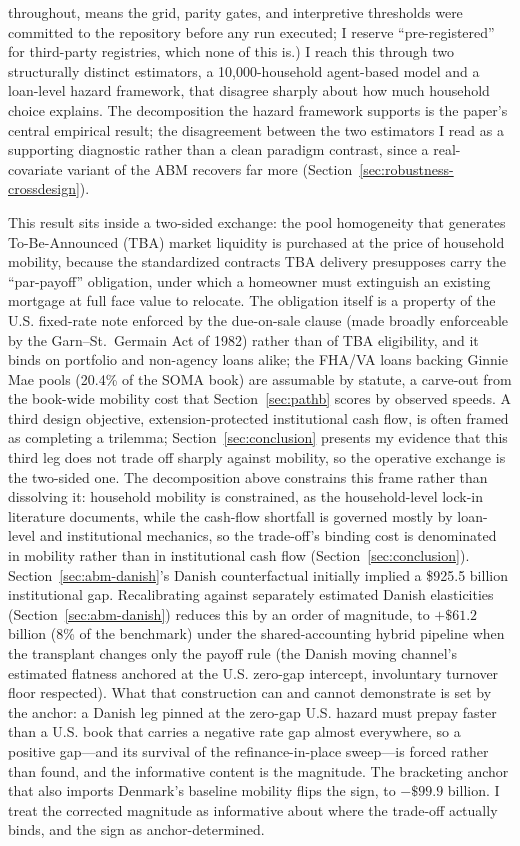 \documentclass[12pt]{article}
\begin{document}
throughout, means the grid, parity gates, and interpretive thresholds were committed to the repository before any run executed; I reserve ``pre-registered'' for third-party registries, which none of this is.) I reach this through two structurally distinct estimators, a 10,000-household agent-based model and a loan-level hazard framework, that disagree sharply about how much household choice explains. The decomposition the hazard framework supports is the paper's central empirical result; the disagreement between the two estimators I read as a supporting diagnostic rather than a clean paradigm contrast, since a real-covariate variant of the ABM recovers far more (Section~\ref{sec:robustness-crossdesign}).

This result sits inside a two-sided exchange: the pool homogeneity that generates To-Be-Announced (TBA) market liquidity is purchased at the price of household mobility, because the standardized contracts TBA delivery presupposes carry the ``par-payoff'' obligation, under which a homeowner must extinguish an existing mortgage at full face value to relocate. The obligation itself is a property of the U.S. fixed-rate note enforced by the due-on-sale clause (made broadly enforceable by the Garn--St.~Germain Act of 1982) rather than of TBA eligibility, and it binds on portfolio and non-agency loans alike; the FHA/VA loans backing Ginnie Mae pools (20.4\% of the SOMA book) are assumable by statute, a carve-out from the book-wide mobility cost that Section~\ref{sec:pathb} scores by observed speeds. A third design objective, extension-protected institutional cash flow, is often framed as completing a trilemma; Section~\ref{sec:conclusion} presents my evidence that this third leg does not trade off sharply against mobility, so the operative exchange is the two-sided one. The decomposition above constrains this frame rather than dissolving it: household mobility is constrained, as the household-level lock-in literature documents, while the cash-flow shortfall is governed mostly by loan-level and institutional mechanics, so the trade-off's binding cost is denominated in mobility rather than in institutional cash flow (Section~\ref{sec:conclusion}). Section~\ref{sec:abm-danish}'s Danish counterfactual initially implied a \$925.5 billion institutional gap. Recalibrating against separately estimated Danish elasticities (Section~\ref{sec:abm-danish}) reduces this by an order of magnitude, to $+\$61.2$ billion (8\% of the benchmark) under the shared-accounting hybrid pipeline when the transplant changes only the payoff rule (the Danish moving channel's estimated flatness anchored at the U.S. zero-gap intercept, involuntary turnover floor respected). What that construction can and cannot demonstrate is set by the anchor: a Danish leg pinned at the zero-gap U.S. hazard must prepay faster than a U.S. book that carries a negative rate gap almost everywhere, so a positive gap---and its survival of the refinance-in-place sweep---is forced rather than found, and the informative content is the magnitude. The bracketing anchor that also imports Denmark's baseline mobility flips the sign, to $-\$99.9$ billion. I treat the corrected magnitude as informative about where the trade-off actually binds, and the sign as anchor-determined.
\end{document}
